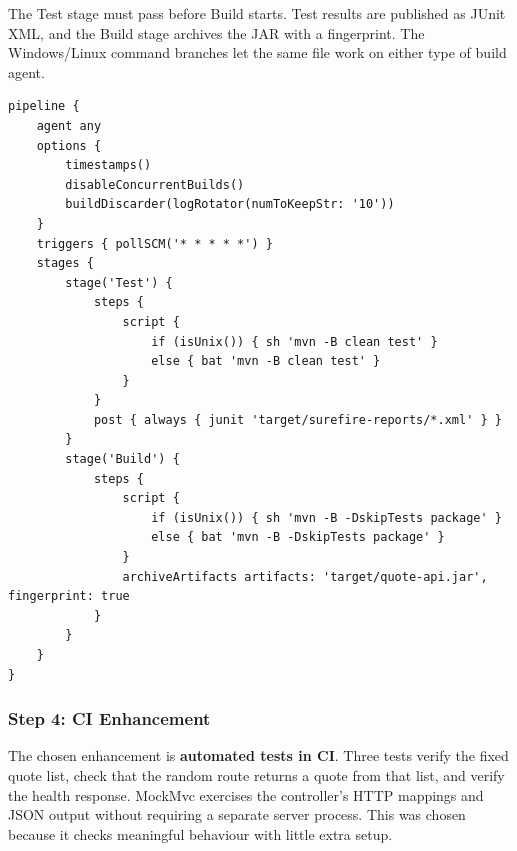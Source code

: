 \documentclass[12pt,a4paper]{article}
\begin{document}
The Test stage must pass before Build starts. Test results are published as JUnit XML, and the Build stage archives the JAR with a fingerprint. The Windows/Linux command branches let the same file work on either type of build agent.

\par\noindent\begin{minipage}{\linewidth}
\begin{lstlisting}[language={}]
pipeline {
    agent any
    options {
        timestamps()
        disableConcurrentBuilds()
        buildDiscarder(logRotator(numToKeepStr: '10'))
    }
    triggers { pollSCM('* * * * *') }
    stages {
        stage('Test') {
            steps {
                script {
                    if (isUnix()) { sh 'mvn -B clean test' }
                    else { bat 'mvn -B clean test' }
                }
            }
            post { always { junit 'target/surefire-reports/*.xml' } }
        }
        stage('Build') {
            steps {
                script {
                    if (isUnix()) { sh 'mvn -B -DskipTests package' }
                    else { bat 'mvn -B -DskipTests package' }
                }
                archiveArtifacts artifacts: 'target/quote-api.jar', fingerprint: true
            }
        }
    }
}
\end{lstlisting}
\end{minipage}\par


\subsubsection*{Step 4: CI Enhancement}
The chosen enhancement is \textbf{automated tests in CI}. Three tests verify the fixed quote list, check that the random route returns a quote from that list, and verify the health response. MockMvc exercises the controller's HTTP mappings and JSON output without requiring a separate server process. This was chosen because it checks meaningful behaviour with little extra setup.
\end{document}
